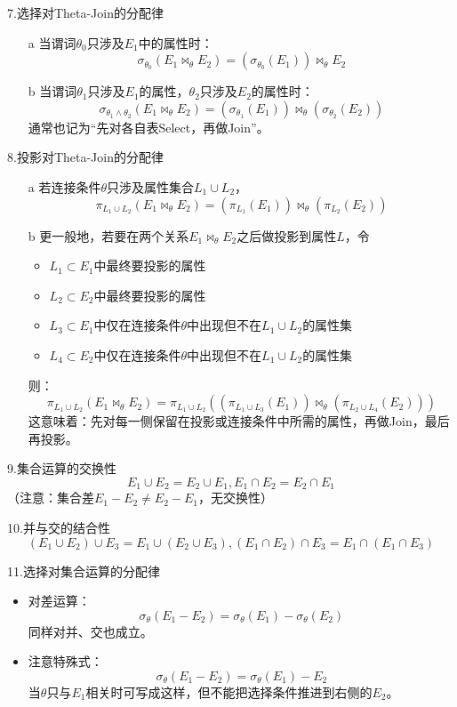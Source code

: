 \noindent 7.选择对Theta-Join的分配律
\begin{itemize}
    \item[a] 当谓词$\theta_0$只涉及$E_1$中的属性时：$$\sigma_{\theta_0}(E_1\Join_{\theta}E_2)=(\sigma_{\theta_0}(E_1))\Join_{\theta}E_2$$
    \item[b] 当谓词$\theta_1$只涉及$E_1$的属性，$\theta_2$只涉及$E_2$的属性时：$$\sigma_{\theta_1\land \theta_2}(E_1\Join_{\theta}E_2)=(\sigma_{\theta_1}(E_1))\Join_{\theta}(\sigma_{\theta_2}(E_2))$$ 通常也记为“先对各自表Select，再做Join”。
\end{itemize}

\noindent 8.投影对Theta-Join的分配律 
\begin{itemize}
    \item[a] 若连接条件$\theta$只涉及属性集合$L_1\cup L_2$，$$\pi_{L_1\cup L_2}(E_1\Join_{\theta}E_2)=(\pi_{L_1}(E_1))\Join_{\theta}(\pi_{L_2}(E_2))$$
    \item[b] 更一般地，若要在两个关系$E_1\Join_{\theta}E_2$之后做投影到属性$L$，令
        \begin{itemize}
            \item $L_1\subset E_1$中最终要投影的属性
            \item $L_2\subset E_2$中最终要投影的属性
            \item $L_3\subset E_1$中仅在连接条件$\theta$中出现但不在$L_1\cup L_2$的属性集
            \item $L_4\subset E_2$中仅在连接条件$\theta$中出现但不在$L_1\cup L_2$的属性集
        \end{itemize}
        则：$$\pi_{L_1\cup L_2}(E_1\Join_{\theta}E_2)=\pi_{L_1\cup L_2}\left((\pi_{L_1\cup L_3}(E_1))\Join_{\theta}(\pi_{L_2\cup L_4}(E_2))\right)$$
        这意味着：先对每一侧保留在投影或连接条件中所需的属性，再做Join，最后再投影。
\end{itemize}

\noindent 9.集合运算的交换性
$$E_1\cup E_2=E_2\cup E_1, E_1\cap E_2=E_2\cap E_1$$ （注意：集合差$E_1-E_2\neq E_2-E_1$，无交换性）

\noindent 10.并与交的结合性
$$(E_1\cup E_2)\cup E_3=E_1\cup (E_2\cup E_3),(E_1\cap E_2)\cap E_3=E_1\cap (E_1\cap E_3)$$

\noindent 11.选择对集合运算的分配律
\begin{itemize}
    \item 对差运算：$$\sigma_{\theta}(E_1-E_2)=\sigma_{\theta}(E_1)-\sigma_{\theta}(E_2)$$同样对并、交也成立。
    \item 注意特殊式：$$\sigma_{\theta}(E_1-E_2)=\sigma_{\theta}(E_1)-E_2$$ 当$\theta$只与$E_1$相关时可写成这样，但不能把选择条件推进到右侧的$E_2$。
\end{itemize}

